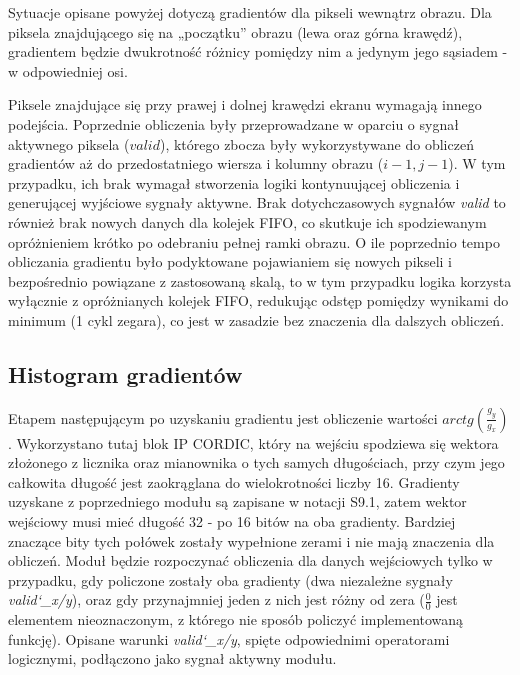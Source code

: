 Sytuacje opisane powyżej dotyczą gradientów dla pikseli wewnątrz obrazu. Dla piksela znajdującego się na „początku” obrazu (lewa oraz górna krawędź), gradientem będzie dwukrotność różnicy pomiędzy nim a jedynym jego sąsiadem - w odpowiedniej osi. 

Piksele znajdujące się przy prawej i dolnej krawędzi ekranu wymagają innego podejścia. Poprzednie obliczenia były przeprowadzane w oparciu o sygnał aktywnego piksela ($valid$), którego zbocza były wykorzystywane do obliczeń gradientów aż do przedostatniego wiersza i kolumny obrazu ($i-1, j-1$). W tym przypadku, ich brak wymagał stworzenia logiki kontynuującej obliczenia i generującej wyjściowe sygnały aktywne. Brak dotychczasowych sygnałów \textit{valid} to również brak nowych danych dla kolejek FIFO, co skutkuje ich spodziewanym opróżnieniem krótko po odebraniu pełnej ramki obrazu. O ile poprzednio tempo obliczania gradientu było podyktowane pojawianiem się nowych pikseli i bezpośrednio powiązane z zastosowaną skalą, to w tym przypadku logika korzysta wyłącznie z opróżnianych kolejek FIFO, redukując odstęp pomiędzy wynikami do minimum (1 cykl zegara), co jest w zasadzie bez znaczenia dla dalszych obliczeń.

\subsection{Histogram gradientów}

Etapem następującym po uzyskaniu gradientu jest obliczenie wartości $arctg(\frac{g_y}{g_x})$. Wykorzystano tutaj blok IP CORDIC, który na wejściu spodziewa się wektora złożonego z licznika oraz mianownika o tych samych długościach, przy czym jego całkowita długość jest zaokrąglana do wielokrotności liczby 16. Gradienty uzyskane z poprzedniego modułu są zapisane w notacji S9.1, zatem wektor wejściowy musi mieć długość 32 - po 16 bitów na oba gradienty. Bardziej znaczące bity tych połówek zostały wypełnione zerami i nie mają znaczenia dla obliczeń. \newline 
Moduł będzie rozpoczynać obliczenia dla danych wejściowych tylko w przypadku, gdy policzone zostały oba gradienty (dwa niezależne sygnały \textit{valid\char`_x/y}), oraz gdy przynajmniej jeden z nich jest różny od zera ($\frac{0}{0}$ jest elementem nieoznaczonym, z którego nie sposób policzyć implementowaną funkcję). Opisane warunki \textit{valid\char`_x/y}, spięte odpowiednimi operatorami logicznymi, podłączono jako sygnał aktywny modułu. 

